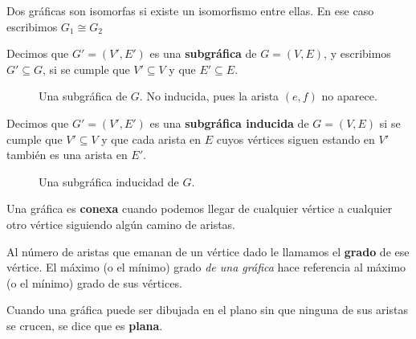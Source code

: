 Dos gr\'aficas son isomorfas si existe un isomorfismo entre ellas. En ese caso escribimos $G_1\cong G_2$

\begin{definition}
Decimos que $G' = (V', E')$ es una \textbf{subgr\'afica} de $G=(V,E)$, y escribimos $G'\subseteq G$, si se cumple que $V'\subseteq V$ y que $E'\subseteq E$.
\end{definition}
\begin{figure}
\centering
  \caption{Una subgr\'afica de $G$. No inducida, pues la arista $(e,f)$ no aparece.}\label{fig:graph}
\end{figure}

\begin{definition}
Decimos que $G' = (V', E')$ es una \textbf{subgr\'afica inducida} de $G=(V,E)$ si se cumple que $V'\subseteq V$ y que cada arista en $E$ cuyos v\'ertices siguen estando en $V'$ tambi\'en es una arista en $E'$.
\end{definition}
\begin{figure}
\centering
  \caption{Una subgr\'afica inducidad de $G$.}\label{fig:graph}
\end{figure}

\begin{definition}
Una gr\'afica es \textbf{conexa} cuando podemos llegar de cualquier v\'ertice a cualquier otro v\'ertice siguiendo alg\'un camino de aristas.
\end{definition}

\begin{definition}
Al n\'umero de aristas que emanan de un v\'ertice dado le llamamos el \textbf{grado} de ese v\'ertice. El m\'aximo (o el m\'inimo) grado \emph{de una gr\'afica} hace referencia al m\'aximo (o el m\'inimo) grado de sus v\'ertices.
\end{definition}

\begin{definition}
Cuando una gr\'afica puede ser dibujada en el plano sin que ninguna de sus aristas se crucen, se dice que es \textbf{plana}.
\end{definition}

